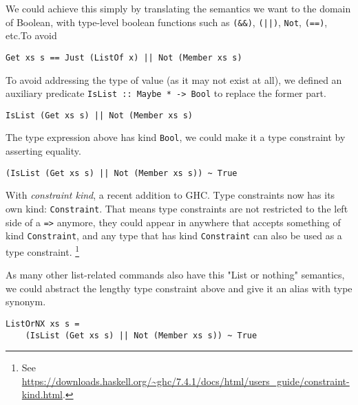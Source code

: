\documentclass[pldi]{sigplanconf-pldi16}
\begin{document}
We could achieve this simply by translating the semantics we want to the
 domain of Boolean, with type-level boolean functions such as
\texttt{(&&)},
\texttt{(||)}, \texttt{Not},
\texttt{(==)}, etc.\footnotemark To avoid


\begin{verbatim}
Get xs s == Just (ListOf x) || Not (Member xs s)
\end{verbatim}

To avoid addressing the type of value (as it may not exist at all), we defined
 an auxiliary predicate \texttt{IsList :: Maybe * -> Bool} to
 replace the former part.

\begin{verbatim}
IsList (Get xs s) || Not (Member xs s)
\end{verbatim}

The type expression above has kind \texttt{Bool}, we could make it
 a type constraint by asserting equality.

\begin{verbatim}
(IsList (Get xs s) || Not (Member xs s)) ~ True
\end{verbatim}

With \emph{constraint kind}, a recent addition to GHC. Type constraints now has
 its own kind: \texttt{Constraint}. That means type constraints
 are not restricted to the left side of a \texttt{=>} anymore,
 they could appear in anywhere that accepts something of kind
 \texttt{Constraint}, and any type that has kind
 \texttt{Constraint} can also be used as a type constraint.
 \footnote{See \url{https://downloads.haskell.org/~ghc/7.4.1/docs/html/users_guide/constraint-kind.html}.}

As many other list-related commands also have this "List or nothing" semantics,
 we could abstract the lengthy type constraint above and give it an alias with
 type synonym.

\begin{verbatim}
ListOrNX xs s =
    (IsList (Get xs s) || Not (Member xs s)) ~ True
\end{verbatim}
\end{document}
